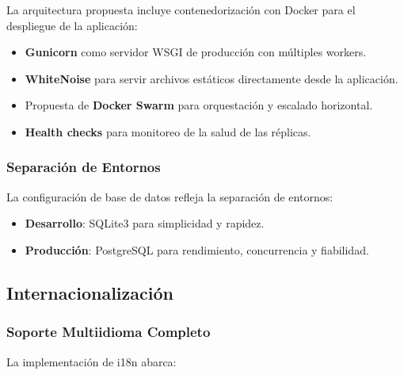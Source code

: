 \documentclass[12pt, a4paper]{article}
\begin{document}
{La arquitectura propuesta incluye contenedorización con Docker para el despliegue de la aplicación:
\begin{itemize}
    \item \textbf{Gunicorn} como servidor WSGI de producción con múltiples workers.
    \item \textbf{WhiteNoise} para servir archivos estáticos directamente desde la aplicación.
    \item Propuesta de \textbf{Docker Swarm} para orquestación y escalado horizontal.
    \item \textbf{Health checks} para monitoreo de la salud de las réplicas.
\end{itemize}

\subsubsection{Separación de Entornos}

La configuración de base de datos refleja la separación de entornos:
\begin{itemize}
    \item \textbf{Desarrollo}: SQLite3 para simplicidad y rapidez.
    \item \textbf{Producción}: PostgreSQL para rendimiento, concurrencia y fiabilidad.
\end{itemize}

\subsection{Internacionalización}

\subsubsection{Soporte Multiidioma Completo}

La implementación de i18n abarca:

}
\end{document}
